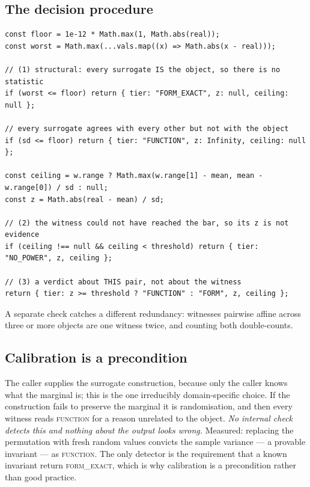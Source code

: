 \documentclass[11pt]{article}
\theoremstyle{remark}
\newcommand{\tier}[1]{\textsc{\MakeLowercase{#1}}}
\begin{document}
\subsection{The decision procedure}

\begin{lstlisting}[caption={The four-tier verdict (abridged from \texttt{src/shuffle-knife.ts}). \texttt{floor} is scaled to the witness magnitude; \texttt{range} is present only for bounded witnesses.},label={lst:knife}]
const floor = 1e-12 * Math.max(1, Math.abs(real));
const worst = Math.max(...vals.map((x) => Math.abs(x - real)));

// (1) structural: every surrogate IS the object, so there is no statistic
if (worst <= floor) return { tier: "FORM_EXACT", z: null, ceiling: null };

// every surrogate agrees with every other but not with the object
if (sd <= floor) return { tier: "FUNCTION", z: Infinity, ceiling: null };

const ceiling = w.range ? Math.max(w.range[1] - mean, mean - w.range[0]) / sd : null;
const z = Math.abs(real - mean) / sd;

// (2) the witness could not have reached the bar, so its z is not evidence
if (ceiling !== null && ceiling < threshold) return { tier: "NO_POWER", z, ceiling };

// (3) a verdict about THIS pair, not about the witness
return { tier: z >= threshold ? "FUNCTION" : "FORM", z, ceiling };
\end{lstlisting}

A separate check catches a different redundancy: witnesses pairwise affine across three
or more objects are one witness twice, and counting both double-counts.

\subsection{Calibration is a precondition}\label{sec:calib}

The caller supplies the surrogate construction, because only the caller knows what the
marginal is; this is the one irreducibly domain-specific choice. If the construction
fails to preserve the marginal it is randomisation, and then every witness reads
\tier{FUNCTION} for a reason unrelated to the object. \emph{No internal check detects
this and nothing about the output looks wrong.} Measured: replacing the permutation with
fresh random values convicts the sample variance --- a provable invariant --- as
\tier{FUNCTION}. The only detector is the requirement that a known invariant return
\tier{FORM\_EXACT}, which is why calibration is a precondition rather than good practice.
\end{document}
